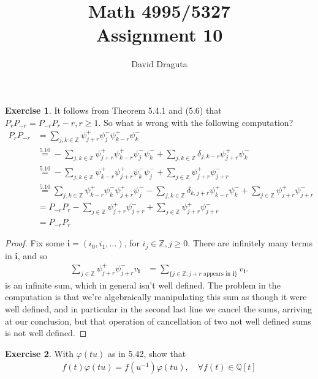 \documentclass[12pt]{extarticle}
\title{ Math 4995/5327
  \\
  Assignment 10}
\author{David Draguta}
\newcommand{\set}[1]{\{#1\}}
\newcommand{\Q}{\mathbb{Q}}
\newcommand{\Z}{\mathbb{Z}}
\newcommand{\<}{\langle}
\renewcommand{\>}{\rangle}
\theoremstyle{definition}
\newtheorem{exercise}{Exercise}
\begin{document}
\maketitle

\begin{exercise}
  It follows from Theorem 5.4.1 and (5.6) that $P_{r}P_{-r} = P_{-r}P_r - r, r \geq 1.$ So what is wrong with the following computation?
  \begin{align*}
    P_r P_{-r}
    &= \sum\limits_{j,k \in \Z} \psi_{j+r}^+ \psi_{j}^-\psi_{k-r}^+\psi_k^- \\
    &\overset{5.10}{=} - \sum\limits_{j,k \in \Z} \psi_{j+r}^+\psi_{k-r}^+\psi_j^-\psi_k^- + \sum\limits_{j,k \in \Z} \delta_{j,k-r}\psi_{j+r}^+\psi_k^- \\
    &\overset{5.10}{=} - \sum\limits_{j,k \in \Z} \psi_{k-r}^+\psi_{j+r}^+\psi_k^-\psi_j^- + \sum\limits_{j \in \Z} \psi_{j+r}^+\psi_{j+r}^- \\
    &\overset{5.10}{=} \sum\limits_{j,k \in \Z} \psi_{k-r}^+\psi_{k}^-\psi_{j+r}^+\psi_j^- - \sum\limits_{j,k \in \Z} \delta_{k,j+r}\psi_{k-r}^+\psi_k^- + \sum\limits_{j \in \Z} \psi_{j+r}^+ \psi_{j+r}^- \\
    &= P_{-r}P_{r} - \sum\limits_{j \in \Z} \psi_{j +r}^+\psi_{j+r}^- + \sum\limits_{j \in \Z} \psi_{j+r}^+\psi_{j+r}^-  \\
    &= P_{-r}P_{r}
  \end{align*}
\end{exercise}
\begin{proof}
  Fix some $\mathbf{i} = (i_0, i_1, \dots)$, for $i_j \in \Z, j \geq 0$. There are infinitely many terms in $\mathbf{i}$, and so  
  \begin{align*}
    \sum\limits_{j \in \Z} \psi_{j +r}^+\psi_{j+r}^- v_{\mathbf{i}}
    &=
    \sum\limits_{\set{j \in \Z: j+r \text{ appears in } \mathbf{i}}} v_{\mathbf{i}}.
  \end{align*}
  is an infinite sum, which in general isn't well defined. The problem in the computation is that we're algebraically manipulating this sum as though it were well defined, and in particular in the second last line we cancel the sums, arriving at our conclusion, but that operation of cancellation of two not well defined sums is not well defined.
\end{proof}
\newpage
\begin{exercise}
  With $\varphi(tu)$ as in 5.42, show that
  \begin{align*}
    f(t)\varphi(tu) = f(u^{-1})\varphi(tu), \quad \forall f(t) \in \Q[t]
  \end{align*}
\end{exercise}
\end{document}
